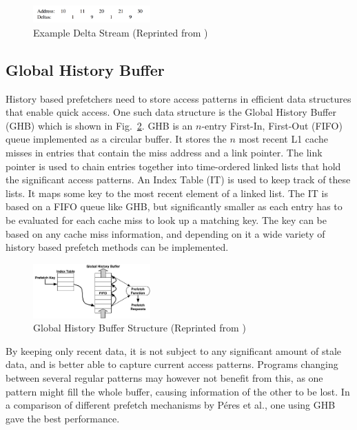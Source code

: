 \documentclass[a4paper]{IEEEtran}
\begin{document}
\begin{figure}[!ht]
  \centering
      \includegraphics[width=0.4\textwidth]{Figures/DCExample}
  \caption{Example Delta Stream (Reprinted from \protect\cite{dcpt})}
  \label{fig:delta_stream}
\end{figure}

\subsection{Global History Buffer}

History based prefetchers need to store access patterns in efficient data structures that enable quick access.
One such data structure is the Global History Buffer (GHB) \cite{ghb} which is shown in Fig.~\ref{fig:ghb}.
GHB is an $n$-entry First-In, First-Out (FIFO) queue implemented as a circular buffer.
It stores the $n$ most recent L1 cache misses in entries that contain the miss address and a link pointer.
The link pointer is used to chain entries together into time-ordered linked lists that hold the significant access patterns.
An Index Table (IT) is used to keep track of these lists.
It maps some key to the most recent element of a linked list.
The IT is based on a FIFO queue like GHB, but significantly smaller as each entry has to be evaluated for each cache miss to look up a matching key.
The key can be based on any cache miss information, and depending on it a wide variety of history based prefetch methods can be implemented.

\begin{figure}[!ht]
  \centering
      \includegraphics[width=0.4\textwidth]{Figures/ghb}
  \caption{Global History Buffer Structure (Reprinted from )}
  \label{fig:ghb}
\end{figure}

By keeping only recent data, it is not subject to any significant amount of stale data, and is better able to capture current access patterns.
Programs changing between several regular patterns may however not benefit from this, as one pattern might fill the whole buffer, causing information of the other to be lost.
In a comparison of different prefetch mechanisms by Péres et al.\cite{microlib}, one using GHB gave the best performance.
\end{document}
